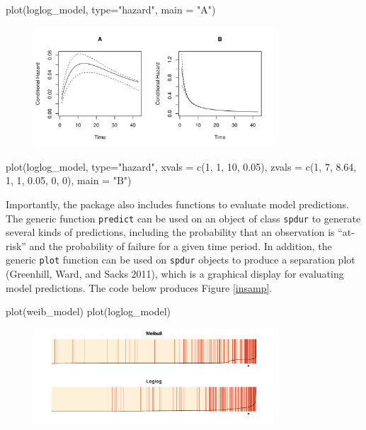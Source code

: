\documentclass[article]{jss}
\begin{document}
\begin{CodeChunk}
\begin{CodeInput}
plot(loglog_model, type="hazard", main = "A")
\end{CodeInput}
\end{CodeChunk}

\begin{figure}
\begin{center}
\includegraphics[width=0.8\textwidth]{graphics/hazard-ex.pdf}
\end{center}
\end{figure}

\begin{CodeChunk}
\begin{CodeInput}
plot(loglog_model, type="hazard", 
     xvals = c(1, 1, 10, 0.05), 
     zvals = c(1, 7, 8.64, 1, 1, 0.05, 0, 0),
     main = "B")
\end{CodeInput}
\end{CodeChunk}

Importantly, the package also includes functions to evaluate model
predictions. The generic function \texttt{predict} can be used on an
object of class \texttt{spdur} to generate several kinds of predictions,
including the probability that an observation is ``at-risk'' and the
probability of failure for a given time period. In addition, the generic
\texttt{plot} function can be used on \texttt{spdur} objects to produce
a separation plot (Greenhill, Ward, and Sacks 2011), which is a
graphical display for evaluating model predictions. The code below
produces Figure \ref{insamp}.

\begin{CodeChunk}
\begin{CodeInput}
plot(weib_model)
plot(loglog_model)
\end{CodeInput}
\end{CodeChunk}

\begin{figure}
\begin{center}
\includegraphics[width=0.8\textwidth]{graphics/sepplots.pdf}
\end{center}
\end{figure}
\end{document}

